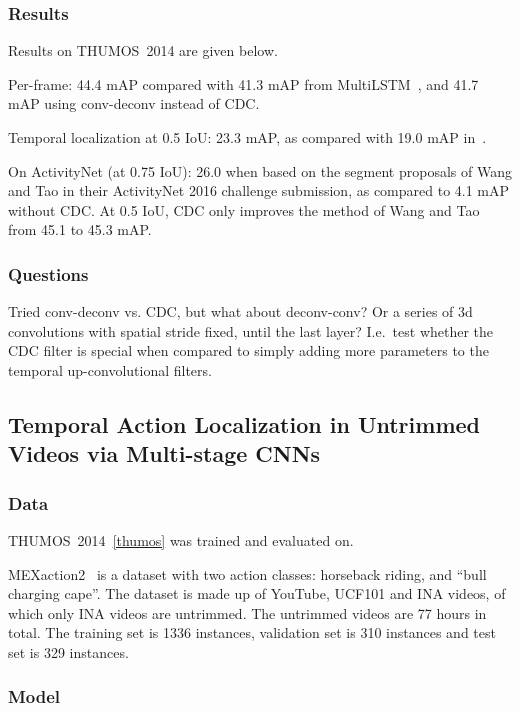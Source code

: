 \documentclass[a4paper, 12pt]{article}
\begin{document}
\subsubsection{Results}

Results on THUMOS~2014 are given below.

Per-frame: 44.4 mAP compared with 41.3 mAP from
MultiLSTM~\cite{DBLP:journals/corr/YeungRJAML15}, and 41.7 mAP using
conv-deconv instead of CDC\@.

Temporal localization at 0.5 IoU\@: 23.3 mAP, as compared with 19.0 mAP
in~\cite{DBLP:journals/corr/ShouWC16}.

On ActivityNet (at 0.75 IoU): 26.0 when based on the segment proposals
of Wang and Tao in their ActivityNet 2016 challenge submission, as compared to
4.1 mAP without CDC\@. At 0.5 IoU, CDC only improves the method of Wang and Tao
from 45.1 to 45.3 mAP\@.

\subsubsection{Questions}

Tried conv-deconv vs. CDC, but what about deconv-conv? Or a series of 3d
convolutions with spatial stride fixed, until the last layer? I.e.\ test
whether the CDC filter is special when compared to simply adding more
parameters to the temporal up-convolutional filters.

\subsection{Temporal Action Localization in Untrimmed Videos via Multi-stage
            CNNs~\cite{DBLP:journals/corr/ShouWC16}}

\subsubsection{Data}

THUMOS~2014~\ref{thumos} was trained and evaluated on.

MEXaction2~\cite{MEXaction2} is a dataset with two action classes: horseback
riding, and ``bull charging cape''. The dataset is made up of YouTube, UCF101
and INA videos, of which only INA videos are untrimmed. The untrimmed videos
are 77 hours in total. The training set is 1336 instances, validation set is
310 instances and test set is 329 instances.

\subsubsection{Model}
\end{document}
